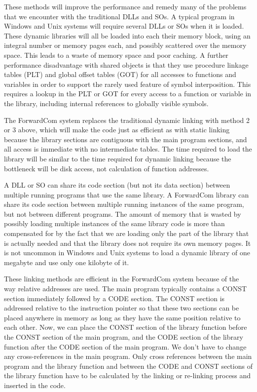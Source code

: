 \documentclass[forwardcom.tex]{subfiles}
\begin{document}
These methods will improve the performance and remedy many of the problems that we encounter with the traditional DLLs and SOs. A typical program in Windows and Unix systems will require several DLLs or SOs when it is loaded. These dynamic libraries will all be loaded into each their memory block, using an integral number or memory pages each, and possibly scattered over the memory space. This leads to a waste of memory space and poor caching. A further performance disadvantage with shared objects is that they use procedure linkage tables (PLT) and global offset tables (GOT) for all accesses to functions and variables in order to support the rarely used feature of symbol interposition. This requires a lookup in the PLT or GOT for every access to a function or variable in the library, including internal references to globally visible symbols.
\vspace{2mm}

The ForwardCom system replaces the traditional dynamic linking with method 2 or 3 above, which will make the code just as efficient as with static linking because the library sections are contiguous with the main program sections, and all access is immediate with no intermediate tables. The time required to load the library will be similar to the time required for dynamic linking because the bottleneck will be disk access, not calculation of function addresses. 
\vspace{2mm}

A DLL or SO can share its code section (but not its data section) between multiple running programs that use the same library. A ForwardCom library can share its code section between multiple running instances of the same program, but not between different programs. The amount of memory that is wasted by possibly loading multiple instances of the same library code is more than compensated for by the fact that we are loading only the part of the library that is actually needed and that the library does not require its own memory pages. It is not uncommon in Windows and Unix systems to load a dynamic library of one megabyte and use only one kilobyte of it. 
\vspace{2mm}

These linking methods are efficient in the ForwardCom system because of the way relative addresses are used. The main program typically contains a CONST section immediately followed by a CODE section. The CONST section is addressed relative to the instruction pointer so that these two sections can be placed anywhere in memory as long as they have the same position relative to each other. Now, we can place the CONST section of the library function before the CONST section of the main program, and the CODE section of the library function after the CODE section of the main program. We don't have to change any cross-references in the main program. Only cross references between the main program and the library function and between the CODE and CONST sections of the library function have to be calculated by the linking or re-linking process and inserted in the code.
\vspace{2mm}
\end{document}
